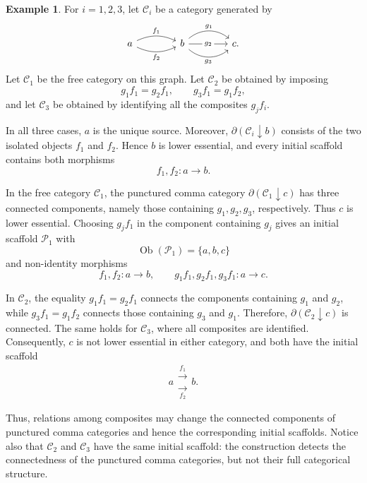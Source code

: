 \documentclass[12pt]{amsart}
\theoremstyle{definition}
\newtheorem{example}[teo]{Example}
\theoremstyle{remark}
\numberwithin{figure}{section}%
\newcommand{\CC}{\mathcal{C}}
\begin{document}
\begin{example}\label{ex:initial-scaffolds-parallel-morphisms}
For \(i=1,2,3\), let \(\CC_i\) be a category generated by
\[
\begin{tikzcd}[column sep=4em]
a
  \arrow[r, "f_1", bend left=25]
  \arrow[r, "f_2"', bend right=25]
&
b
  \arrow[r, "g_1", bend left=40]
  \arrow[r, "g_2" description]
  \arrow[r, "g_3"', bend right=40]
&
c.
\end{tikzcd}
\]
Let \(\CC_1\) be the free category on this graph. Let \(\CC_2\) be
obtained by imposing
\[
g_1f_1=g_2f_1,
\qquad
g_3f_1=g_1f_2,
\]
and let \(\CC_3\) be obtained by identifying all the composites
\(g_jf_i\).

In all three cases, \(a\) is the unique source. Moreover,
\(\partial(\CC_i\downarrow b)\) consists of the two isolated objects
\(f_1\) and \(f_2\). Hence \(b\) is lower essential, and every initial
scaffold contains both morphisms
\[
f_1,f_2\colon a\to b.
\]

In the free category \(\CC_1\), the punctured comma category
\(\partial(\CC_1\downarrow c)\) has three connected components, namely
those containing \(g_1,g_2,g_3\), respectively. Thus \(c\) is lower
essential. Choosing \(g_jf_1\) in the component containing \(g_j\)
gives an initial scaffold \(\mathcal P_1\) with
\[
\operatorname{Ob}(\mathcal P_1)=\{a,b,c\}
\]
and non-identity morphisms
\[
f_1,f_2\colon a\to b,
\qquad
g_1f_1,g_2f_1,g_3f_1\colon a\to c.
\]

In \(\CC_2\), the equality \(g_1f_1=g_2f_1\) connects the components
containing \(g_1\) and \(g_2\), while
\(g_3f_1=g_1f_2\) connects those containing \(g_3\) and \(g_1\).
Therefore, \(\partial(\CC_2\downarrow c)\) is connected. The same holds
for \(\CC_3\), where all composites are identified. Consequently,
\(c\) is not lower essential in either category, and both have the
initial scaffold
\[
a
\mathrel{\substack{\xrightarrow{f_1}\\[-1mm]\xrightarrow[f_2]{}}}
b.
\]

Thus, relations among composites may change the connected components of
punctured comma categories and hence the corresponding initial
scaffolds. Notice also that \(\CC_2\) and \(\CC_3\) have the same initial
scaffold: the construction detects the connectedness of the punctured
comma categories, but not their full categorical structure.
\end{example}
\end{document}
